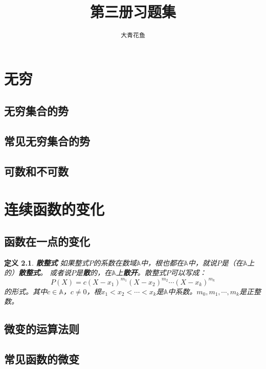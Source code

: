 \documentclass[12pt,UTF8]{ctexbook}
\title{\zihao{0} \bfseries 第三册习题集}
\author{\zihao{2} \texttt{大青花鱼}}
\date{}
\newtheorem{df}{定义}[section]
\begin{document}
\maketitle
\tableofcontents
\newpage


\chapter{无穷}

\section{无穷集合的势}

\section{常见无穷集合的势}

\section{可数和不可数}

\chapter{连续函数的变化}

\section{函数在一点的变化}

\begin{df}{\textbf{散整式}}
    如果整式$P$的系数在数域$\mathbb{A}$中，根也都在$\mathbb{A}$中，就说$P$是（在$\mathbb{A}$上的）\textbf{散整式}。
    或者说$P$是\textbf{散}的，在$\mathbb{A}$上\textbf{散开}。散整式$P$可以写成：
    $$P(X) = c(X - x_1)^{m_1}(X - x_2)^{m_2}\cdots(X - x_k)^{m_k}$$
    的形式。其中$c\in \mathbb{A}$，$c\neq 0$，根$x_1 < x_2 < \cdots < x_k$是$\mathbb{A}$中系数。$m_0, m_1, \cdots, m_k$是正整数。
    
\end{df}

\section{微变的运算法则}

\section{常见函数的微变}
\end{document}
